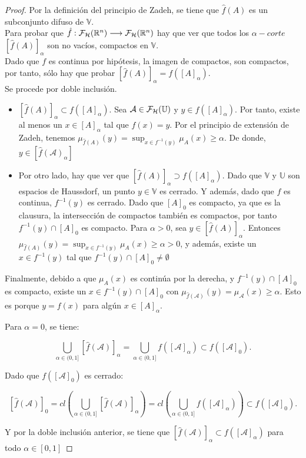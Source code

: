   \begin{proof}
    Por la definición del principio de Zadeh, se tiene que $\hat{f}(A)$ es un subconjunto difuso de $\mathbb{V}$. \\
    Para probar que $\hat{f} : \mathcal{F}_\mathcal{H}(\mathbb R^n) \longrightarrow \mathcal{F}_\mathcal{H}(\mathbb R^n)$ hay que ver que todos los $\alpha-corte$ $[\hat{f}(A)]_\alpha$ son no vacíos, compactos en $\mathbb{V}$. \\
    Dado que $f$ es continua por hipótesis, la imagen de compactos, son compactos, por tanto, sólo hay que probar $[\hat{f}(A)]_\alpha = f([A]_\alpha)$. \\
    Se procede por doble inclusión.
    
    \begin{itemize}
    \item $[\hat{f}(A)]_\alpha \subset f([A]_\alpha)$. Sea $\mathcal{A} \in \mathcal{F}_\mathcal{H}(\mathbb U)$ y $y \in f([A]_\alpha)$. Por tanto, existe al menos un $x \in [A]_\alpha$ tal que $f(x)=y$. Por el principio de extensión de Zadeh, tenemos $\mu_{\hat{f}(A)}(y)=\sup_{x\in f^{-1}(y)} \mu_A(x) \geq \alpha$. De donde, $y \in [\hat{f}(\mathcal{A})_\alpha]$
    \item Por otro lado, hay que ver que $[\hat{f}(A)]_\alpha \supset f([A]_\alpha)$. Dado que $\mathbb{V}$ y $\mathbb{U}$ son espacios de Haussdorf, un punto $y \in \mathbb{V}$ es cerrado. Y además, dado que $f$ es continua, $f^{-1}(y)$ es cerrado. Dado que $[A]_0$ es compacto, ya que es la clausura, la intersección de compactos también es compactos, por tanto $f^{-1}(y) \cap [A]_0$ es compacto. Para $\alpha>0$, sea $y \in [\hat{f}(A)]_\alpha$. Entonces $\mu_{\hat{f}(A)}(y)=\sup_{x\in f^{-1}(y)} \mu_A(x) \geq \alpha>0$, y además, existe un $x\in f^{-1}(y)$ tal que $f^{-1}(y) \cap [A]_0 \neq \emptyset$
    \end{itemize}
    Finalmente, debido a que $\mu_A(x)$ es continúa por la derecha, y $f^{-1}(y) \cap [A]_0$ es compacto, existe un $x \in f^{-1}(y) \cap [A]_0$ con $\mu_{\hat{f}(\mathcal{A})}(y)=\mu_{\mathcal{A}}(x) \geq \alpha$. Esto es porque $y=f(x)$ para algún $x \in [A]_\alpha$.
    
    Para $\alpha=0$, se tiene:
    
    $$
    \bigcup_{\alpha \in (0, 1]} [\hat{f}(\mathcal{A})]_\alpha = \bigcup_{\alpha \in (0, 1]} f([\mathcal{A}]_\alpha) \subset f([\mathcal{A}]_0).
	$$
	
	Dado que $f([\mathcal{A}]_0)$ es cerrado:
	
	$$
	[\hat{f}(\mathcal{A})]_0 = cl\left( \bigcup_{\alpha \in (0, 1]} [\hat{f}(\mathcal{A})]_\alpha  \right) = cl\left(\bigcup_{\alpha \in (0, 1]} f([\mathcal{A}]_\alpha) \right)	\subset f([\mathcal{A}]_0).
	    $$
	    
	    Y por la doble inclusión anterior, se tiene que $[\hat{f}(\mathcal{A})]_\alpha \subset f([\mathcal{A}]_\alpha)$ para todo $\alpha \in [0, 1]$
  \end{proof}


